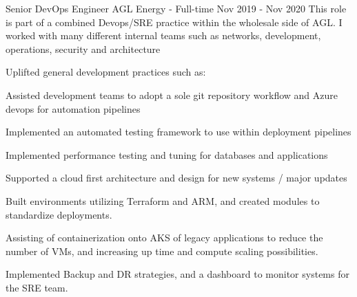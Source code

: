 \begin{cventries}
  \cventryextended
  {Senior DevOps Engineer} %
  {AGL Energy - Full-time} %
  {} %
  {Nov 2019 - Nov 2020} %
  {This role is part of a combined Devops/SRE practice within the wholesale
    side
    of AGL. I
    worked with many different internal teams such as networks, development,
    operations, security
    and architecture}
  {
    \begin{cvitems} %
      \item{Uplifted general development practices such as:
                  \\
                  \begin{cvitems}
                    \item {Assisted development teams to adopt a sole git
                                repository
                                workflow and Azure devops for automation
                                pipelines}
                    \item {Implemented an automated testing framework to use
                                within
                                deployment pipelines}
                    \item {Implemented performance testing and tuning for
                                databases and
                                applications}
                    \item {Supported a cloud first architecture and design for
                                new systems
                                / major updates \\}
                  \end{cvitems}
            }
      \item {Built environments utilizing Terraform and ARM, and created
                  modules
                  to standardize deployments.}
      \item {Assisting of containerization onto AKS of legacy applications to
                  reduce the number of VMs, and increasing up time and compute
                  scaling
                  possibilities.}
      \item {Implemented Backup and DR strategies, and a dashboard to monitor
                  systems for the SRE team. }
    \end{cvitems}
  }


\end{cventries}
